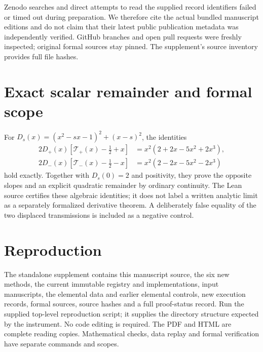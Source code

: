 \documentclass[11pt]{article}
\begin{document}
Zenodo searches and direct attempts to read the supplied record identifiers failed or timed out during preparation. We therefore cite the actual bundled manuscript editions and do not claim that their latest public publication metadata was independently verified. GitHub branches and open pull requests were freshly inspected; original formal sources stay pinned. The supplement's source inventory provides full file hashes.

\section{Exact scalar remainder and formal scope}
For $D_s(x)=(x^2-sx-1)^2+(x-s)^2$, the identities
\begin{align}
2D_+(x)[\mathcal T_+(x)-\tfrac12+x]&=x^2(2+2x-5x^2+2x^3),\\
2D_-(x)[\mathcal T_-(x)-\tfrac12-x]&=x^2(2-2x-5x^2-2x^3)
\end{align}
hold exactly. Together with $D_s(0)=2$ and positivity, they prove the opposite slopes and an explicit quadratic remainder by ordinary continuity. The Lean source certifies these algebraic identities; it does not label a written analytic limit as a separately formalized derivative theorem. A deliberately false equality of the two displaced transmissions is included as a negative control.

\section{Reproduction}
The standalone supplement contains this manuscript source, the six new methods, the current immutable registry and implementations, input manuscripts, the elemental data and earlier elemental controls, new execution records, formal sources, source hashes and a full proof-status record. Run the supplied top-level reproduction script; it supplies the directory structure expected by the instrument. No code editing is required. The PDF and HTML are complete reading copies. Mathematical checks, data replay and formal verification have separate commands and scopes.
\end{document}
